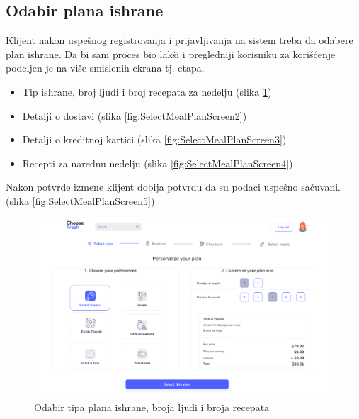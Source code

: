 \subsection{Odabir plana ishrane}

Klijent nakon uspešnog registrovanja i prijavljivanja na sistem treba da odabere plan ishrane. Da bi sam proces bio lakši i pregledniji korisniku za korišćenje podeljen je na više smislenih ekrana tj. etapa.
\begin{itemize}
    \item Tip ishrane, broj ljudi i broj recepata za nedelju (slika \ref{fig:SelectMealPlanScreen1})
    \item Detalji o dostavi (slika \ref{fig:SelectMealPlanScreen2})
    \item Detalji o kreditnoj kartici (slika \ref{fig:SelectMealPlanScreen3})
    \item Recepti za narednu nedelju (slika \ref{fig:SelectMealPlanScreen4})
\end{itemize}
Nakon potvrde izmene klijent dobija potvrdu da su podaci uspešno sačuvani. (slika \ref{fig:SelectMealPlanScreen5})

\begin{figure}[H]
	\begin{center}
		\includegraphics[width=\textwidth]{UI/Select Meal Plan (Screen 1).png}
    		\caption{Odabir tipa plana ishrane, broja ljudi i broja recepata}
    \label{fig:SelectMealPlanScreen1}
    \end{center}
\end{figure}

